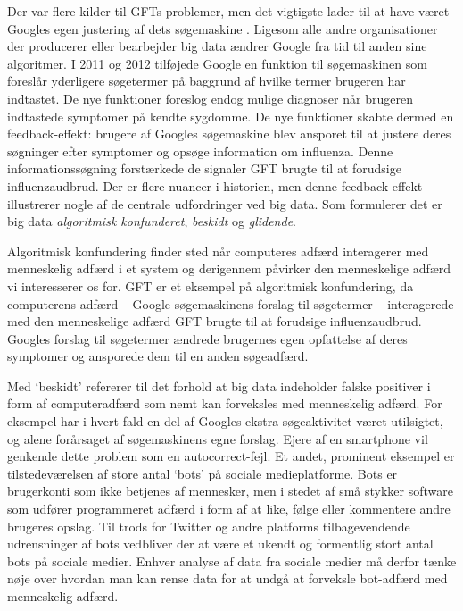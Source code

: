 \documentclass[12pt,]{article}
\begin{document}
Der var flere kilder til GFTs problemer, men det vigtigste lader til at
have været Googles egen justering af dets søgemaskine \citep{LKKV14}.
Ligesom alle andre organisationer der producerer eller bearbejder big
data ændrer Google fra tid til anden sine algoritmer. I 2011 og 2012
tilføjede Google en funktion til søgemaskinen som foreslår yderligere
søgetermer på baggrund af hvilke termer brugeren har indtastet. De nye
funktioner foreslog endog mulige diagnoser når brugeren indtastede
symptomer på kendte sygdomme. De nye funktioner skabte dermed en
feedback-effekt: brugere af Googles søgemaskine blev ansporet til at
justere deres søgninger efter symptomer og opsøge information om
influenza. Denne informationssøgning forstærkede de signaler GFT brugte
til at forudsige influenzaudbrud. Der er flere nuancer i historien, men
denne feedback-effekt illustrerer nogle af de centrale udfordringer ved
big data. Som \citet{salganik17} formulerer det er big data
\emph{algoritmisk konfunderet}, \emph{beskidt} og \emph{glidende}.

Algoritmisk konfundering finder sted når computeres adfærd interagerer
med menneskelig adfærd i et system og derigennem påvirker den
menneskelige adfærd vi interesserer os for. GFT er et eksempel på
algoritmisk konfundering, da computerens adfærd -- Google-søgemaskinens
forslag til søgetermer -- interagerede med den menneskelige adfærd GFT
brugte til at forudsige influenzaudbrud. Googles forslag til søgetermer
ændrede brugernes egen opfattelse af deres symptomer og ansporede dem
til en anden søgeadfærd.

Med `beskidt' refererer \citet{salganik17} til det forhold at big data
indeholder falske positiver i form af computeradfærd som nemt kan
forveksles med menneskelig adfærd. For eksempel har i hvert fald en del
af Googles ekstra søgeaktivitet været utilsigtet, og alene forårsaget af
søgemaskinens egne forslag. Ejere af en smartphone vil genkende dette
problem som en autocorrect-fejl. Et andet, prominent eksempel er
tilstedeværelsen af store antal `bots' på sociale medieplatforme. Bots
er brugerkonti som ikke betjenes af mennesker, men i stedet af små
stykker software som udfører programmeret adfærd i form af at like,
følge eller kommentere andre brugeres opslag. Til trods for Twitter og
andre platforms tilbagevendende udrensninger af bots vedbliver der at
være et ukendt og formentlig stort antal bots på sociale medier. Enhver
analyse af data fra sociale medier må derfor tænke nøje over hvordan man
kan rense data for at undgå at forveksle bot-adfærd med menneskelig
adfærd.
\end{document}
